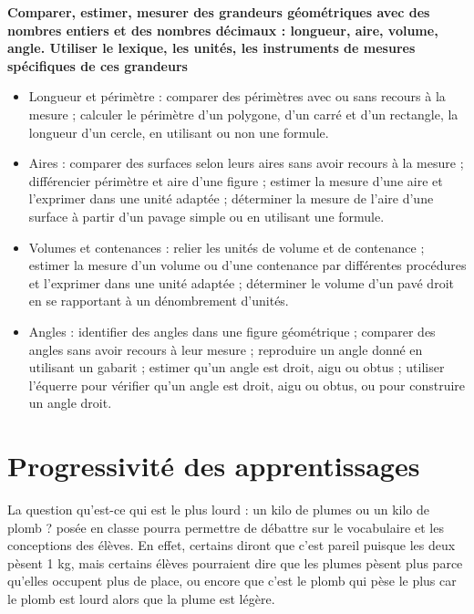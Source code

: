 \begin{prerequis}
   {\bf\small Comparer, estimer, mesurer des grandeurs géométriques avec des nombres entiers et des nombres décimaux : longueur, aire, volume, angle. Utiliser le lexique, les unités, les instruments de mesures spécifiques de ces grandeurs}
   \begin{itemize}
      \item Longueur et périmètre : comparer des périmètres avec ou sans recours à la mesure ; calculer le périmètre d’un polygone, d’un carré et d’un rectangle, la longueur d’un cercle, en utilisant ou non une formule.
      \item Aires : comparer des surfaces selon leurs aires sans avoir recours à la mesure ; différencier périmètre et aire d’une figure ; estimer la mesure d’une aire et l’exprimer dans une unité adaptée ; déterminer la mesure de l’aire d’une surface à partir d’un pavage simple ou en utilisant une formule.
      \item Volumes et contenances : relier les unités de volume et de contenance ; estimer la mesure d’un volume ou d’une contenance par différentes procédures et l’exprimer dans une unité adaptée ; déterminer le volume d’un pavé droit en se rapportant à un dénombrement d’unités.
      \item Angles : identifier des angles dans une figure géométrique ; comparer des angles sans avoir recours à leur mesure ; reproduire un angle donné en utilisant un gabarit ; estimer qu’un angle est droit, aigu ou obtus ; utiliser l’équerre pour vérifier qu’un angle est droit, aigu ou obtus, ou pour construire un angle droit.
   \end{itemize}
\end{prerequis}


\reperes

\section{Progressivité des apprentissages} %

La question \og qu’est-ce qui est le plus lourd : un kilo de plumes ou un kilo de plomb ? \fg{} posée en classe pourra permettre de débattre sur le vocabulaire et les conceptions des élèves. En effet, certains diront que c'est pareil puisque les deux pèsent 1 kg, mais certains élèves pourraient dire que les plumes pèsent plus parce qu'elles occupent plus de place, ou encore que c'est le plomb qui pèse le plus car le plomb est lourd alors que la plume est légère. 

